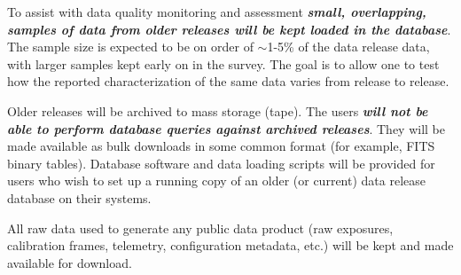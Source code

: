 To assist with data quality monitoring and assessment \textbf{\emph{small, overlapping, samples of data from older releases will be kept loaded in the database}}. The sample size is expected to be on order of $\sim$1-5\% of the data release data, with larger samples kept early on in the survey. The goal is to allow one to test how the reported characterization of the same data varies from release to release.

Older releases will be archived to mass storage (tape). The users \textbf{\emph{will not be able to perform database queries against archived releases}}. They will be made available as bulk downloads in some common format (for example, FITS binary tables). Database software and data loading scripts will be provided for users who wish to set up a running copy of an older (or current) data release database on their systems.

All raw data used to generate any public data product (raw exposures, calibration frames, telemetry, configuration metadata, etc.) will be kept and made available for download. 

